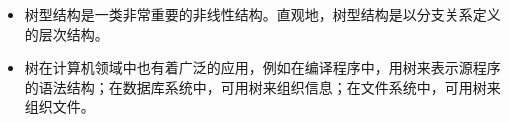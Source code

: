 
\begin{frame}
\begin{itemize}
\item
树型结构是一类非常重要的非线性结构。直观地，树型结构是以分支关系定义的层次结构。\\[0.1in]
\item
树在计算机领域中也有着广泛的应用，例如在编译程序中，用树来表示源程序的语法结构；在数据库系统中，可用树来组织信息；在文件系统中，可用树来组织文件。\\[0.1in]
\end{itemize}               
\end{frame}


%
%
%

%
%

